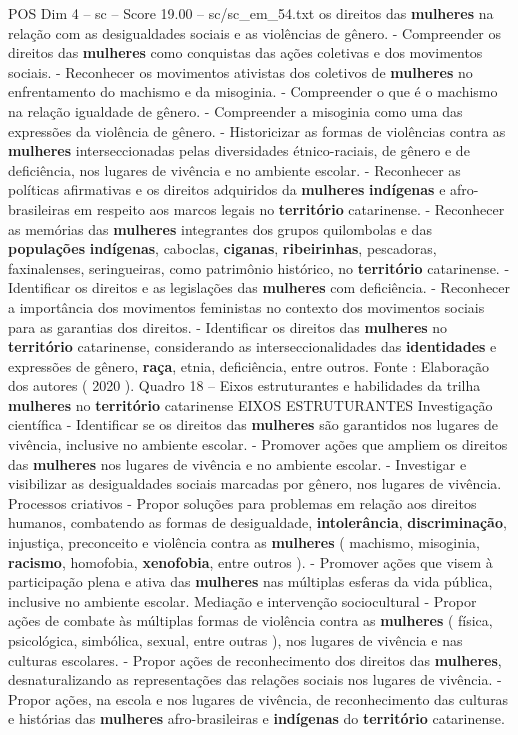\begin{textsample}{POS Dim 4 – sc – Score 19.00 – sc/sc\_em\_54.txt}
os direitos das \textbf{mulheres} na relação com as desigualdades sociais e as violências de gênero. - Compreender os direitos das \textbf{mulheres} como conquistas das ações coletivas e dos movimentos sociais. - Reconhecer os movimentos ativistas dos coletivos de \textbf{mulheres} no enfrentamento do machismo e da misoginia. - Compreender o que é o machismo na relação igualdade de gênero. - Compreender a misoginia como uma das expressões da violência de gênero. - Historicizar as formas de violências contra as \textbf{mulheres} interseccionadas pelas diversidades étnico-raciais, de gênero e de deficiência, nos lugares de vivência e no ambiente escolar. - Reconhecer as políticas afirmativas e os direitos adquiridos da \textbf{mulheres} \textbf{indígenas} e afro-brasileiras em respeito aos marcos legais no \textbf{território} catarinense. - Reconhecer as memórias das \textbf{mulheres} integrantes dos grupos quilombolas e das \textbf{populações} \textbf{indígenas}, caboclas, \textbf{ciganas}, \textbf{ribeirinhas}, pescadoras, faxinalenses, seringueiras, como patrimônio histórico, no \textbf{território} catarinense. - Identificar os direitos e as legislações das \textbf{mulheres} com deficiência. - Reconhecer a importância dos movimentos feministas no contexto dos movimentos sociais para as garantias dos direitos. - Identificar os direitos das \textbf{mulheres} no \textbf{território} catarinense, considerando as interseccionalidades das \textbf{identidades} e expressões de gênero, \textbf{raça}, etnia, deficiência, entre outros.
Fonte : Elaboração dos autores ( 2020 ).
Quadro 18 – Eixos estruturantes e habilidades da trilha \textbf{mulheres} no \textbf{território} catarinense EIXOS ESTRUTURANTES Investigação científica - Identificar se os direitos das \textbf{mulheres} são garantidos nos lugares de vivência, inclusive no ambiente escolar. - Promover ações que ampliem os direitos das \textbf{mulheres} nos lugares de vivência e no ambiente escolar. - Investigar e visibilizar as desigualdades sociais marcadas por gênero, nos lugares de vivência.
Processos criativos - Propor soluções para problemas em relação aos direitos humanos, combatendo as formas de desigualdade, \textbf{intolerância}, \textbf{discriminação}, injustiça, preconceito e violência contra as \textbf{mulheres} ( machismo, misoginia, \textbf{racismo}, homofobia, \textbf{xenofobia}, entre outros ). - Promover ações que visem à participação plena e ativa das \textbf{mulheres} nas múltiplas esferas da vida pública, inclusive no ambiente escolar.
Mediação e intervenção sociocultural - Propor ações de combate às múltiplas formas de violência contra as \textbf{mulheres} ( física, psicológica, simbólica, sexual, entre outras ), nos lugares de vivência e nas culturas escolares. - Propor ações de reconhecimento dos direitos das \textbf{mulheres}, desnaturalizando as representações das relações sociais nos lugares de vivência. - Propor ações, na escola e nos lugares de vivência, de reconhecimento das culturas e histórias das \textbf{mulheres} afro-brasileiras e \textbf{indígenas} do \textbf{território} catarinense.

\end{textsample}
